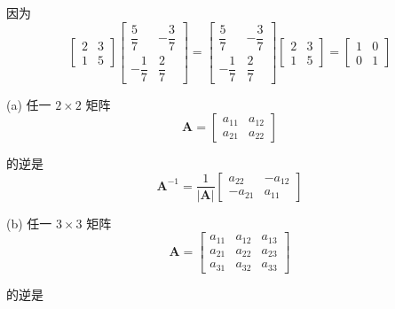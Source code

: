 因为
\[
\begin{bmatrix} 2 & 3 \\ 1 & 5 \end{bmatrix}\begin{bmatrix} \dfrac{5}{7} & -\dfrac{3}{7} \\[8pt] -\dfrac{1}{7} & \dfrac{2}{7} \end{bmatrix}
= \begin{bmatrix} \dfrac{5}{7} & -\dfrac{3}{7} \\[8pt] -\dfrac{1}{7} & \dfrac{2}{7} \end{bmatrix}\begin{bmatrix} 2 & 3 \\ 1 & 5 \end{bmatrix}
= \begin{bmatrix} 1 & 0 \\ 0 & 1 \end{bmatrix}
\]


(a) 任一 $2\times2$ 矩阵
\[
\bm{A} = \begin{bmatrix} a_{11} & a_{12} \\ a_{21} & a_{22} \end{bmatrix}
\]

的逆是
\[
\bm{A}^{-1} = \frac{1}{|\bm{A}|}\begin{bmatrix} a_{22} & -a_{12} \\ -a_{21} & a_{11} \end{bmatrix}
\]

(b) 任一 $3\times3$ 矩阵
\[
\bm{A} = \begin{bmatrix} a_{11} & a_{12} & a_{13} \\ a_{21} & a_{22} & a_{23} \\ a_{31} & a_{32} & a_{33} \end{bmatrix}
\]

的逆是
